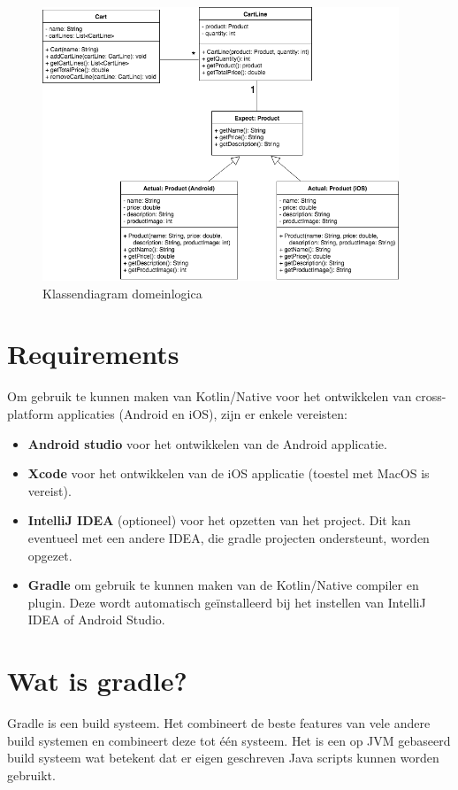 \begin{figure} [ht]
	\centering
	\includegraphics[width=0.95\textwidth]{img/domeinmodel.png}
	\caption{Klassendiagram domeinlogica}
	\label{fig:domeinmodel-kn}
\end{figure}

\section{Requirements}
Om gebruik te kunnen maken van Kotlin/Native voor het ontwikkelen van cross-platform applicaties (Android en iOS), zijn er enkele vereisten:
\begin{itemize}
	\item \textbf{Android studio} voor het ontwikkelen van de Android applicatie.
	\item \textbf{Xcode} voor het ontwikkelen van de iOS applicatie (toestel met MacOS is vereist).
	\item \textbf{IntelliJ IDEA} (optioneel) voor het opzetten van het project. Dit kan eventueel met een andere IDEA, die gradle projecten ondersteunt, worden opgezet.
	\item \textbf{Gradle} om gebruik te kunnen maken van de Kotlin/Native compiler en plugin. Deze wordt automatisch geïnstalleerd bij het instellen van IntelliJ IDEA of Android Studio.
\end{itemize}

\section{Wat is gradle?}
Gradle is een build systeem. Het combineert de beste features van vele andere build systemen en combineert deze tot één systeem. Het is een op JVM gebaseerd build systeem wat betekent dat er eigen geschreven Java scripts kunnen worden gebruikt. 


